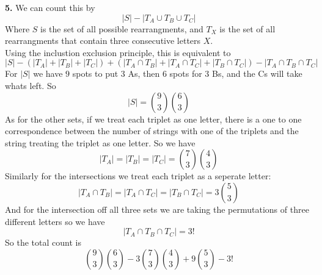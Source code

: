 \documentclass[12pt]{article}
\newenvironment{ques}{\vspace{2 ex}}{\vspace{2 ex}}
\theoremstyle{definition}
\begin{document}
\begin{ques}
	\textbf{5.}
		We can count this by 
		$$|S| - |T_A \cup T_B \cup T_C|$$
		Where $S$ is the set of all possible rearrangments, and $T_X$ is
		the set of all rearrangments that contain three consecutive
		letters $X$.\\
		Using the inclustion exclusion principle, this is equivalent to
		$$|S| - (|T_A| + |T_B| + |T_C|) + (|T_A \cap T_B| + |T_A \cap
		T_C| + |T_B \cap T_C|) - |T_A \cap T_B \cap T_C|$$
		For $|S|$ we have $9$ spots to put $3$ As, then $6$ spots for
		$3$ Bs, and the Cs will take whats left. So 
		$$|S| = \binom{9}{3} \binom{6}{3}$$
		As for the other sets, if we treat each triplet as one letter,
		there is a one to one correspondence between the number of
		strings with one of the triplets and the string treating the
		triplet as one letter. So we have
		$$|T_A| = |T_B| = |T_C| = \binom{7}{3} \binom{4}{3}$$
		Similarly for the intersections we treat each triplet as a seperate letter:
		$$|T_A \cap T_B| =  |T_A \cap T_C| = |T_B \cap T_C| = 3\binom{5}{3}$$
		And for the intersection off all three sets we are taking the
		permutations of three different letters so we have
		$$|T_A \cap T_B \cap T_C| = 3!$$
		So the total count is 
		$$\binom{9}{3}\binom{6}{3} - 3\binom{7}{3}\binom{4}{3} + 9\binom{5}{3} - 3!$$
\end{ques}
\end{document}
